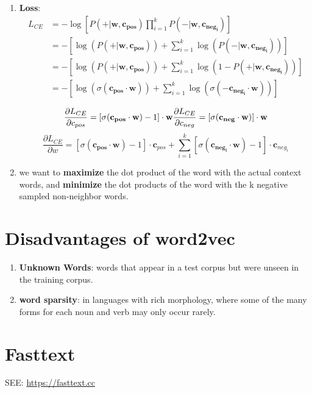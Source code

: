 \begin{enumerate}
    \item \textbf{Loss}:
    \begin{align*}
        L_{CE} 
        &= -\log\left[ P(+|\mathbf{w, c_{pos}}) \prod_{i=1}^{k} P(-|\mathbf{w, c_{neg_i}}) \right]\\ 
        &= -\left[ \log(P(+|\mathbf{w, c_{pos}})) + \sum_{i=1}^{k} \log(P(-|\mathbf{w, c_{neg_i}})) \right]\\ 
        &= -\left[ \log(P(+|\mathbf{w, c_{pos}})) + \sum_{i=1}^{k} \log(1-P(+|\mathbf{w, c_{neg_i}})) \right]\\ 
        &= -\left[ \log(\sigma(\mathbf{c_{pos}\cdot w})) + \sum_{i=1}^{k} \log(\sigma(\mathbf{-c_{neg_i}\cdot w})) \right]\\ 
    \end{align*}
    \[
        \displaystyle \dfrac{\partial L_{CE}}{\partial c_{pos}} = [\sigma(\mathbf{c_{pos}\cdot w})-1]\cdot \mathbf{w} \hfill \displaystyle \dfrac{\partial L_{CE}}{\partial c_{neg}} = [\sigma(\mathbf{c_{neg}\cdot w})]\cdot \mathbf{w}
    \]
    \[
        \displaystyle \dfrac{\partial L_{CE}}{\partial w} = [\sigma(\mathbf{c_{pos}\cdot w})-1]\cdot \mathbf{c}_{pos} + \sum_{i=1}^{k}[\sigma(\mathbf{c_{neg_i}\cdot w})-1]\cdot \mathbf{c}_{neg_i}
    \]


    \item we want to \textbf{maximize} the dot product of the word with the actual context words, and \textbf{minimize} the dot products of the word with the k negative sampled non-neighbor words.

    
    
\end{enumerate}

\section*{Disadvantages of word2vec \cite{nlp-1}}
\begin{enumerate}
    \item \textbf{Unknown Words}: words that appear in a test corpus but were unseen in the training corpus.

    \item \textbf{word sparsity}: in languages with rich morphology, where some of the many forms for each noun and verb may only occur rarely.
\end{enumerate}

\section{Fasttext \cite{nlp-1}}\label{Fasttext}
SEE: \url{https://fasttext.cc}

